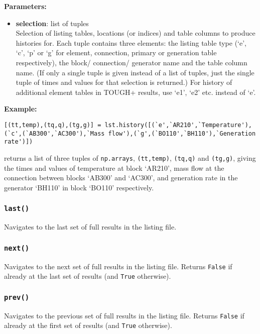\textbf{Parameters:}
\begin{itemize}
\item \textbf{selection}: list of tuples\\
  Selection of listing tables, locations (or indices) and table columns to produce histories for.  Each tuple contains three elements: the listing table type (`e', `c', `p' or `g' for element, connection, primary or generation table respectively), the block/ connection/ generator name and the table column name.  (If only a single tuple is given instead of a list of tuples, just the single tuple of times and values for that selection is returned.)  For history of additional element tables in TOUGH+ results, use `e1', `e2' etc. instead of `e'.
\end{itemize}

\textbf{Example:}

\begin{verbatim}
[(tt,temp),(tq,q),(tg,g)] = lst.history([(`e',`AR210',`Temperature'),
(`c',(`AB300',`AC300'),`Mass flow'),(`g',(`BO110',`BH110'),`Generation rate')])
\end{verbatim}

returns a list of three tuples of \texttt{np.arrays}, \texttt{(tt,temp)}, \texttt{(tq,q)} and \texttt{(tg,g)}, giving the times and values of temperature at block `AR210', mass flow at the connection between blocks `AB300' and `AC300', and generation rate in the generator `BH110' in block `BO110' respectively.

\subsubsection{\texttt{last()}}

Navigates to the last set of full results in the listing file.

\subsubsection{\texttt{next()}}

Navigates to the next set of full results in the listing file.  Returns \texttt{False} if already at the last set of results (and \texttt{True} otherwise).

\subsubsection{\texttt{prev()}}

Navigates to the previous set of full results in the listing file.  Returns \texttt{False} if already at the first set of results (and \texttt{True} otherwise).

